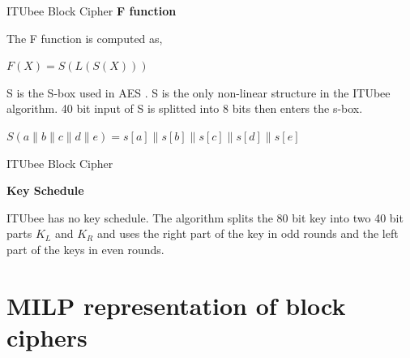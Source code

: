 \documentclass{beamer}
\begin{document}
\begin{frame}{ITUbee Block Cipher}
    \textbf{F function} \linebreak
    
    The F function is computed as,\\
    \begin{center}
        $F (X) = S(L(S(X)))$
    \end{center}
    
    S is the S-box used in AES \cite{dworkin2001advanced}. S is the only non-linear structure in the ITUbee algorithm.  40 bit input of S is splitted into 8 bits then enters the s-box.
    \begin{center}
        $S(a\parallel b \parallel c \parallel d \parallel e) = s[a] \parallel s[b] \parallel s[c] \parallel s[d] \parallel s[e]$ 
    \end{center}
    

\end{frame}
\begin{frame}{ITUbee Block Cipher}

    \textbf{Key Schedule} \linebreak
    
    ITUbee has no key schedule. The algorithm splits the 80 bit key into two 40 bit parts $K_L$ and $K_R$ and uses the right part of the key in odd rounds and the left part of the keys in even rounds.

\end{frame}
\section{MILP representation of block ciphers}
\end{document}

